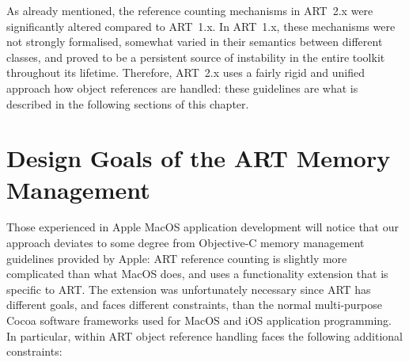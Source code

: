 As already mentioned, the reference counting mechanisms in ART~2.x were significantly altered compared to ART~1.x. In ART~1.x, these mechanisms were not strongly formalised, somewhat varied in their semantics between different classes, and proved to be a persistent source of instability in the entire toolkit throughout its lifetime. Therefore, ART~2.x uses a fairly rigid and unified approach how object references are handled: these guidelines are what is described in the following sections of this chapter. 

\section{Design Goals of the ART Memory Management}

Those experienced in Apple MacOS application development will notice that our approach deviates to some degree from Objective-C memory management guidelines provided by Apple: ART reference counting is slightly more complicated than what MacOS does, and uses a functionality extension that is specific to ART. The extension was unfortunately necessary since ART has different goals, and faces different constraints, than the normal multi-purpose Cocoa software frameworks used for MacOS and iOS application programming. In particular, within ART object reference handling faces the following additional constraints: 
